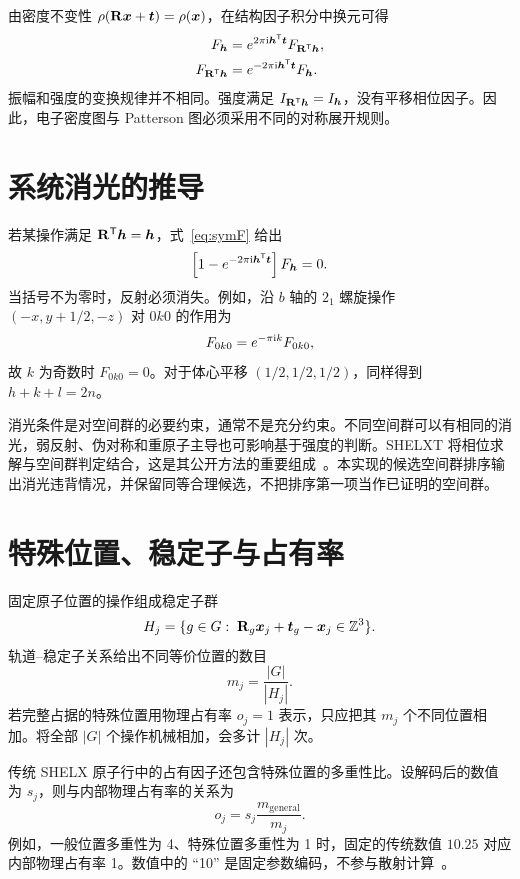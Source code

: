 由密度不变性 $\rho(\mathbf{R}\bm{x}+\bm{t})=\rho(\bm{x})$，在结构因子积分中换元可得
\begin{align}
F_{\bm{h}}
&=e^{2\pi\mathrm{i}\bm{h}^{\mathsf T}\bm{t}}F_{\mathbf{R}^{\mathsf T}\bm{h}},\\
F_{\mathbf{R}^{\mathsf T}\bm{h}}
&=e^{-2\pi\mathrm{i}\bm{h}^{\mathsf T}\bm{t}}F_{\bm{h}}.
\label{eq:symF}
\end{align}
振幅和强度的变换规律并不相同。强度满足 $I_{\mathbf{R}^{\mathsf T}\bm{h}}=I_{\bm{h}}$，没有平移相位因子。因此，电子密度图与 Patterson 图必须采用不同的对称展开规则。

\section{系统消光的推导}
若某操作满足 $\mathbf{R}^{\mathsf T}\bm{h}=\bm{h}$，式~\eqref{eq:symF} 给出
\begin{equation}
\left[1-e^{-2\pi\mathrm{i}\bm{h}^{\mathsf T}\bm{t}}\right]F_{\bm{h}}=0.
\end{equation}
当括号不为零时，反射必须消失。例如，沿 $b$ 轴的 $2_1$ 螺旋操作 $(-x,y+1/2,-z)$ 对 $0k0$ 的作用为
\begin{equation}
F_{0k0}=e^{-\pi\mathrm{i} k}F_{0k0},
\end{equation}
故 $k$ 为奇数时 $F_{0k0}=0$。对于体心平移 $(1/2,1/2,1/2)$，同样得到 $h+k+l=2n$。

消光条件是对空间群的必要约束，通常不是充分约束。不同空间群可以有相同的消光，弱反射、伪对称和重原子主导也可影响基于强度的判断。SHELXT 将相位求解与空间群判定结合，这是其公开方法的重要组成~\cite{shelxt2015}。本实现的候选空间群排序输出消光违背情况，并保留同等合理候选，不把排序第一项当作已证明的空间群。

\section{特殊位置、稳定子与占有率}
固定原子位置的操作组成稳定子群
\begin{equation}
H_j=\{g\in G:\;\mathbf{R}_g\bm{x}_j+\bm{t}_g-\bm{x}_j\in\mathbb Z^3\}.
\end{equation}
轨道--稳定子关系给出不同等价位置的数目
\begin{equation}
m_j=\frac{|G|}{|H_j|}.
\end{equation}
若完整占据的特殊位置用物理占有率 $o_j=1$ 表示，只应把其 $m_j$ 个不同位置相加。将全部 $|G|$ 个操作机械相加，会多计 $|H_j|$ 次。

传统 SHELX 原子行中的占有因子还包含特殊位置的多重性比。设解码后的数值为 $s_j$，则与内部物理占有率的关系为
\begin{equation}
o_j=s_j\frac{m_{\mathrm{general}}}{m_j}.
\label{eq:shelxsof}
\end{equation}
例如，一般位置多重性为 4、特殊位置多重性为 1 时，固定的传统数值 $10.25$ 对应内部物理占有率 1。数值中的 ``10'' 是固定参数编码，不参与散射计算~\cite{shelxl_instructions}。

